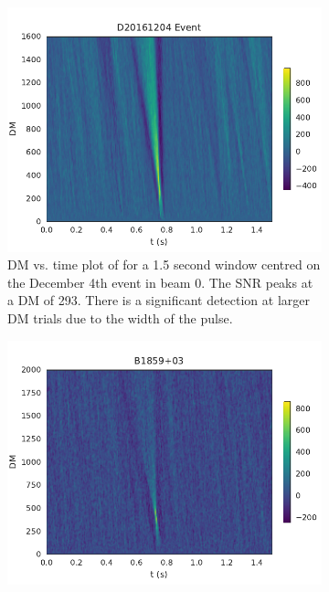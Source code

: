 \documentclass[a4paper,fleqn,usenatbib]{mnras}
\begin{document}
\begin{figure}
    \centering
    \begin{subfigure}[t]{0.5\textwidth}
        \centering\captionsetup{width=.95\linewidth}
        \includegraphics[width=1.0\textwidth]{figures/D20161204_dmtrials_buf23_Beam0.pdf}
        \caption{DM vs. time plot of for a 1.5 second window centred on the December
        4th event in beam 0. The SNR peaks at a DM of 293. There is a significant
        detection at larger DM trials due to the width of the pulse.
        }
        \label{fig:dm_time_event}
    \end{subfigure}
    \begin{subfigure}[t]{0.5\textwidth}
        \centering\captionsetup{width=.95\linewidth}
        \includegraphics[width=1.0\textwidth]{figures/B1859_dmtrials.pdf}

\end{subfigure}
\end{figure}
\end{document}
